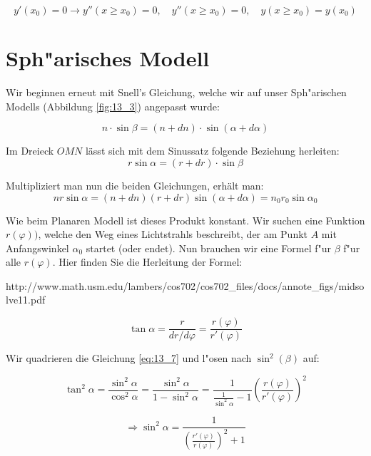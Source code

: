 $$y'(x_0) = 0 \longrightarrow y''(x \geq x_0) = 0, \quad y''(x \geq x_0) = 0, \quad 
y(x \geq x_0) = y(x_0)$$



\section{Sph"arisches Modell}

Wir beginnen erneut mit Snell's Gleichung, welche wir auf unser Sph"arischen Modells
(Abbildung \ref{fig:13_3}) angepasst wurde: 

$$n \cdot \sin \beta = (n + dn) \cdot \sin(\alpha + d\alpha)$$

Im Dreieck $OMN$ lässt sich mit dem Sinussatz folgende Beziehung herleiten:
$$r \sin\alpha = (r + dr) \cdot \sin\beta$$

Multipliziert man nun die beiden Gleichungen, erhält man:
\begin{equation} \label{eq:13_6}
n r \sin \alpha = (n + dn)(r + dr) \sin (\alpha + d\alpha) = n_0 r_0 \sin \alpha_0
\end{equation}

Wie beim Planaren Modell ist dieses Produkt konstant. Wir suchen eine Funktion
$r(\varphi))$, welche den Weg eines Lichtstrahls beschreibt, der am Punkt $A$ mit
Anfangswinkel $\alpha_0$ startet (oder endet). Nun brauchen wir eine Formel f"ur $\beta$
f"ur alle $r(\varphi)$. Hier finden Sie die Herleitung der Formel:

http://www.math.usm.edu/lambers/cos702/cos702\_files/docs/annote\_figs/midsolve11.pdf

\begin{equation} \label{eq:13_7}
\tan \alpha = \frac{r}{dr/d\varphi} = \frac{r(\varphi)}{r'(\varphi)}
\end{equation}

Wir quadrieren die Gleichung \ref{eq:13_7} und l"osen nach $\sin^2(\beta)$ auf:

$$\tan^2 \alpha = \frac{\sin^2\alpha}{\cos^2\alpha} = \frac{\sin^2\alpha}{1-\sin^2\alpha} =
\frac{1}{\frac{1}{\sin^2\alpha}-1} \left( \frac{r(\varphi)}{r'(\varphi)} \right)^2$$

\begin{equation} \label{eq:13_8}
\Rightarrow \sin^2\alpha = \frac{1}{\left( \frac{r'(\varphi)}{r(\varphi)} \right)^2 +1}
\end{equation}

